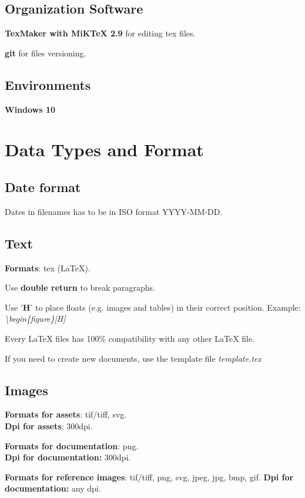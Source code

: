 \documentclass[12pt]{article}
\begin{document}
\subsection{Organization Software}
\textbf{TexMaker with MiKTeX 2.9} for editing tex files.

\textbf{git} for files versioning.

\subsection{Environments}
\textbf{Windows 10}

\section{Data Types and Format}

\subsection{Date format}
Dates in filenames has to be in ISO format YYYY-MM-DD.

\subsection{Text}
\textbf{Formats}: tex (LaTeX).


Use \textbf{double return} to break paragraphs.

Use '\textbf{H}' to place floats (e.g. images and tables) in their correct position. Example: \textit{\textbackslash{}begin\{figure\}[H]}

Every LaTeX files has 100\% compatibility with any other LaTeX file.

If you need to create new documents, use the template file \textit{template.tex}

\subsection{Images}
\textbf{Formats for assets}: tif/tiff, svg.\\
\textbf{Dpi for assets}: 300dpi.

\textbf{Formats for documentation}: png.\\
\textbf{Dpi for documentation:} 300dpi.

\textbf{Formats for reference images}: tif/tiff, png, svg, jpeg, jpg, bmp, gif.
\textbf{Dpi for documentation:} any dpi.
\end{document}
